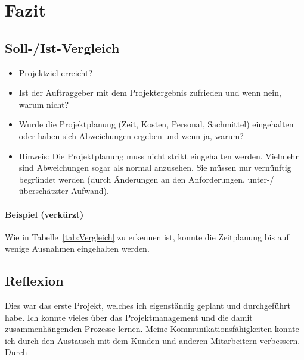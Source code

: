 \section{Fazit} 
\label{sec:Fazit}

\subsection{Soll-/Ist-Vergleich}
\label{sec:SollIstVergleich}

\begin{itemize}
	\item Projektziel erreicht?
	\item Ist der Auftraggeber mit dem Projektergebnis zufrieden und wenn nein, warum nicht?
	\item Wurde die Projektplanung (Zeit, Kosten, Personal, Sachmittel) eingehalten oder haben sich Abweichungen ergeben und wenn ja, warum?
	\item Hinweis: Die Projektplanung muss nicht strikt eingehalten werden. Vielmehr sind Abweichungen sogar als normal anzusehen. Sie müssen nur vernünftig begründet werden (\zB durch Änderungen an den Anforderungen, unter-/überschätzter Aufwand).
\end{itemize}

\paragraph{Beispiel (verkürzt)}
Wie in Tabelle~\ref{tab:Vergleich} zu erkennen ist, konnte die Zeitplanung bis auf wenige Ausnahmen eingehalten werden.


\subsection{Reflexion}
\label{sec:Reflexion}
Dies war das erste Projekt, welches ich eigenständig geplant und durchgeführt habe. Ich konnte vieles über das Projektmanagement und die damit zusammenhängenden Prozesse lernen. Meine Kommunikationsfähigkeiten konnte ich durch den Austausch mit dem Kunden und anderen Mitarbeitern verbessern. Durch 
\begin{comment}
	\item Was hat der Prüfling bei der Durchführung des Projekts gelernt (\zB Zeitplanung, Vorteile der eingesetzten Frameworks, Änderungen der Anforderungen)?
\end{comment}


